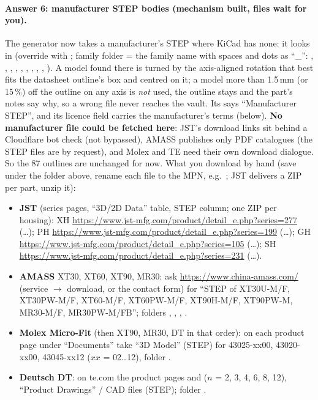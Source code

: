 \paragraph{Answer 6: manufacturer STEP bodies (mechanism built, files wait for you).} The generator now takes a
manufacturer's STEP where KiCad has none: it looks in 
(override with ; family folder = the family name with spaces and dots as ``\_'':
, , , , , , , ,
, ). A model found there is turned by the axis-aligned rotation that
best fits the datasheet outline's box and centred on it; a model more than 1.5\,mm (or 15\,\%) off the outline on any
axis is \emph{not} used, the outline stays and the part's notes say why, so a wrong file never reaches the vault. Its
 says ``Manufacturer STEP'', and its licence field carries the manufacturer's terms (below).
\textbf{No manufacturer file could be fetched here}: JST's download links sit behind a Cloudflare bot check (not
bypassed), AMASS publishes only PDF catalogues (the STEP files are by request), and Molex and TE need their own
download dialogue. So the 87 outlines are unchanged for now. What you download by hand (save under the folder above,
rename each file to the MPN, e.g.\ ; JST delivers a ZIP per part, unzip it):
\begin{itemize}[nosep]
  \item \textbf{JST} (series pages, ``3D/2D Data'' table, STEP column; one ZIP per housing):
        XH \url{https://www.jst-mfg.com/product/detail_e.php?series=277} (\dots{});
        PH \url{https://www.jst-mfg.com/product/detail_e.php?series=199} (\dots);
        GH \url{https://www.jst-mfg.com/product/detail_e.php?series=105} (\dots);
        SH \url{https://www.jst-mfg.com/product/detail_e.php?series=231} (\dots).
  \item \textbf{AMASS} XT30, XT60, XT90, MR30: ask \url{https://www.china-amass.com/} (service $\to$ download, or the
        contact form) for ``STEP of XT30U-M/F, XT30PW-M/F, XT60-M/F, XT60PW-M/F, XT90H-M/F, XT90PW-M, MR30-M/F,
        MR30PW-M/FB''; folders , , , .
  \item \textbf{Molex Micro-Fit} (then XT90, MR30, DT in that order): on each product page under ``Documents'' take
        ``3D Model'' (STEP) for 43025-xx00, 43020-xx00, 43045-xx12 ($xx$ = 02\dots12), folder
        .
  \item \textbf{Deutsch DT}: on te.com the product pages  and  ($n$ = 2, 3, 4, 6, 8, 12),
        ``Product Drawings'' / CAD files (STEP); folder .
\end{itemize}
